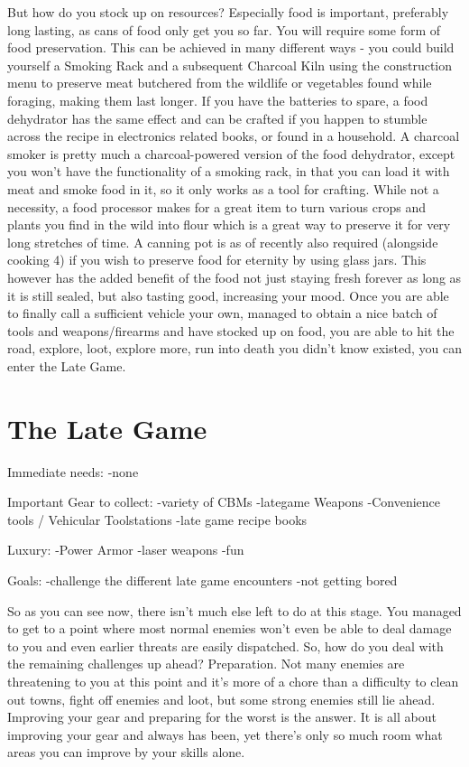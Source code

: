\documentclass[11pt]{report}
\begin{document}
But how do you stock up on resources? Especially food is important, preferably long lasting, as cans of food only get you so far. You will require some form of food preservation.
This can be achieved in many different ways - you could build yourself a Smoking Rack and a subsequent Charcoal Kiln using the construction menu to preserve meat butchered from the wildlife or vegetables found while foraging, making them last longer. If you have the batteries to spare, a food dehydrator has the same effect and can be crafted if you happen to stumble across the recipe in electronics related books, or found in a household. A charcoal smoker is pretty much a charcoal-powered version of the food dehydrator, except you won't have the functionality of a smoking rack, in that you can load it with meat and smoke food in it, so it only works as a tool for crafting. While not a necessity, a food processor makes for a great item to turn various crops and plants you find in the wild into flour which is a great way to preserve it for very long stretches of time. A canning pot is as of recently also required (alongside cooking 4) if you wish to preserve food for eternity by using glass jars. This however has the added benefit of the food not just staying fresh forever as long as it is still sealed, but also tasting good, increasing your mood.
Once you are able to finally call a sufficient vehicle your own, managed to obtain a nice batch of tools and weapons/firearms and have stocked up on food, you are able to hit the road, explore, loot, explore more, run into death you didn't know existed, you can enter the Late Game.

\section{The Late Game}

Immediate needs:
-none

Important Gear to collect:
-variety of CBMs
-lategame Weapons
-Convenience tools / Vehicular Toolstations
-late game recipe books

Luxury:
-Power Armor
-laser weapons
-fun

Goals:
-challenge the different late game encounters
-not getting bored

So as you can see now, there isn't much else left to do at this stage. You managed to get to a point where most normal enemies won't even be able to deal damage to you and even earlier threats are easily dispatched.
So, how do you deal with the remaining challenges up ahead? Preparation. Not many enemies are threatening to you at this point and it's more of a chore than a difficulty to clean out towns, fight off enemies and loot, but some strong enemies still lie ahead. Improving your gear and preparing for the worst is the answer. It is all about improving your gear and always has been, yet there's only so much room what areas you can improve by your skills alone.
\end{document}
